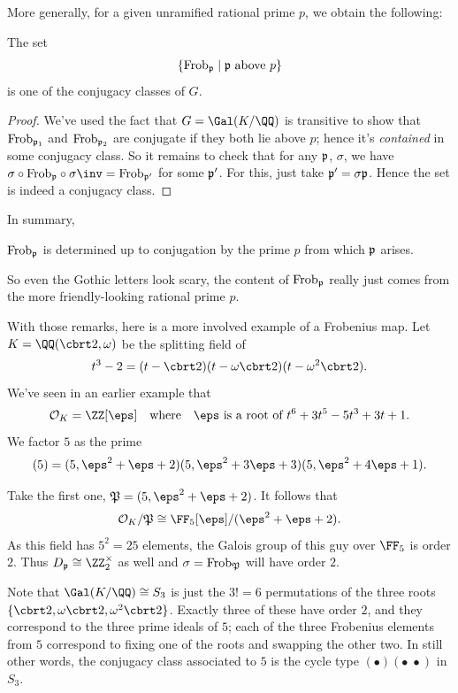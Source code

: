 More generally, for a given unramified rational prime $p$, we obtain the following:
\begin{theorem}
	The set
	\[ \left\{ \mathrm{Frob}_\mathfrak p \mid \mathfrak p \text{ above } p \right\} \]
	is one of the conjugacy classes of $G$.
\end{theorem}
\begin{proof}
	We've used the fact that $G = \Gal(K/\QQ)$ is transitive
	to show that $\mathrm{Frob}_{\mathfrak p_1}$ and $\mathrm{Frob}_{\mathfrak p_2}$ are conjugate
	if they both lie above $p$; hence it's \emph{contained} in some
	conjugacy class.
	So it remains to check that for any $\mathfrak p$, $\sigma$,
	we have $\sigma \circ \Frob_\pp \circ \sigma\inv = \Frob_{\pp'}$
	for some $\mathfrak p'$. For this, just take $\mathfrak p' = \sigma\mathfrak p$.
	Hence the set is indeed a conjugacy class.
\end{proof}

In summary,
\begin{moral}
	$\mathrm{Frob}_{\mathfrak p}$ is determined up to conjugation by the prime $p$
	from which $\mathfrak p$ arises.
\end{moral}
So even the Gothic letters look scary, the content of $\mathrm{Frob}_{\mathfrak p}$
really just comes from the more friendly-looking rational prime $p$.


\begin{example}
	With those remarks, here is a more involved example of a Frobenius map.
	Let $K = \QQ(\cbrt2, \omega)$ be the splitting field of 
	\[ t^3-2 = (t-\cbrt2)(t-\omega\cbrt2)(t-\omega^2\cbrt2). \]
	We've seen in an earlier example that
	\[ \OO_K = \ZZ[\eps] \quad\text{where}\quad \eps \text { is a root of } t^6+3t^5-5t^3+3t+1. \]
	We factor $5$ as the prime
	\[ (5) = (5, \eps^2+\eps+2)(5, \eps^2+3\eps+3)(5, \eps^2+4\eps+1). \]

	Take the first one, $\mathfrak P = (5, \eps^2+\eps+2)$.
	It follows that \[ \OO_K / {\mathfrak P} \cong \FF_5[\eps] / (\eps^2+\eps+2). \]
	As this field has $5^2=25$ elements,
	the Galois group of this guy over $\FF_5$ is order $2$.
	Thus $D_\pp \cong \Zm 2$ as well and $\sigma = \mathrm{Frob}_{\mathfrak P}$ will have order $2$.

	Note that $\Gal(K/\QQ) \cong S_3$ is just the $3!=6$
	permutations of the three roots $\{\cbrt2,\omega\cbrt2,\omega^2\cbrt2\}$.
	Exactly three of these have order $2$,
	and they correspond to the three prime ideals of $5$;
	each of the three Frobenius elements from $5$ correspond to
	fixing one of the roots and swapping the other two.
	In still other words, the conjugacy class associated to $5$
	is the cycle type $(\bullet)(\bullet \; \bullet)$ in $S_3$.
\end{example}


